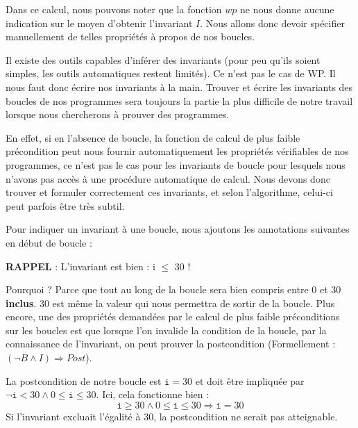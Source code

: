Dans ce calcul, nous pouvons noter que la fonction $wp$ ne nous donne aucune
indication sur le moyen d'obtenir l'invariant $I$. Nous allons donc devoir 
spécifier manuellement de telles propriétés à propos de nos boucles.





Il existe des outils capables d'inférer des invariants (pour peu qu'ils soient
simples, les outils automatiques restent limités). Ce n'est pas le cas de WP.
Il nous faut donc écrire nos invariants à la main. Trouver et écrire les 
invariants des boucles de nos programmes sera toujours la partie la plus difficile
de notre travail lorsque nous chercherons à prouver des programmes.



En effet, si en l'absence de boucle, la fonction de calcul de plus faible 
précondition peut nous fournir automatiquement les propriétés vérifiables de nos
programmes, ce n'est pas le cas pour les invariants de boucle pour lesquels 
nous n'avons pas accès à une procédure automatique de calcul. Nous devons donc 
trouver et formuler correctement ces invariants, et selon l'algorithme, celui-ci
peut parfois être très subtil.



Pour indiquer un invariant à une boucle, nous ajoutons les annotations suivantes
en début de boucle :






\begin{Warning}
\textbf{RAPPEL} : L'invariant est bien : i \textbf{$\leq$} 30 !
\end{Warning}


Pourquoi ? Parce que tout au long de la boucle  sera bien compris entre
0 et 30 \textbf{inclus}. 30 est même la valeur qui nous permettra de sortir de la 
boucle. Plus encore, une des propriétés demandées par le calcul de plus faible
préconditions sur les boucles est que lorsque l'on invalide la condition de la
boucle, par la connaissance de l'invariant, on peut prouver la postcondition 
(Formellement : $(\neg B \wedge I) \Rightarrow Post$).



La postcondition de notre boucle est $\texttt{i} = 30$ et doit être impliquée par
$\neg \texttt{i} < 30 \wedge 0 \leq \texttt{i} \leq 30$. Ici, cela fonctionne 
bien : 
$$\texttt{i} \geq 30 \wedge 0 \leq \texttt{i} \leq 30 \Rightarrow \texttt{i} = 30$$
Si l'invariant excluait l'égalité à 30, la postcondition ne serait pas atteignable.




